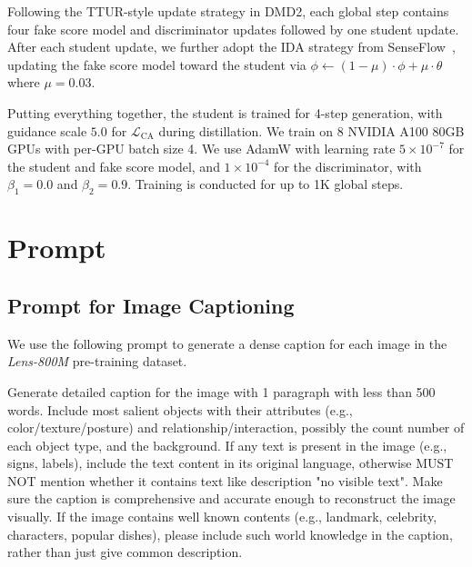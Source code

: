 Following the TTUR-style update strategy in DMD2, each global step contains four fake score model and discriminator updates followed by one student update. After each student update, we further adopt the IDA strategy from SenseFlow~\citep{senseflow}, updating the fake score model toward the student via $\phi \leftarrow (1-\mu) \cdot \phi+\mu \cdot \theta$ where $\mu=0.03$.

Putting everything together, the student is trained for 4-step generation, with guidance scale $5.0$ for $\mathcal{L_{\mathrm{CA}}}$ during distillation. We train on 8 NVIDIA A100 80GB GPUs with per-GPU batch size 4. We use AdamW with learning rate $5\times10^{-7}$ for the student and fake score model, and $1\times10^{-4}$ for the discriminator, with $\beta_1=0.0$ and $\beta_2=0.9$. Training is conducted for up to 1K global steps.



\section{Prompt}
\label{sec:all-prompts}

\subsection{Prompt for Image Captioning}
\label{sec:prompt-caption}

We use the following prompt to generate a dense caption for each image in the \textit{Lens-800M} pre-training dataset.

\begin{tcolorbox}[
  breakable,
  enhanced,
  colback=white,
  colframe=black!70,
  boxrule=0.8pt,
  arc=2pt,
  title={Prompt for Image Captioning},
  colbacktitle=black!75,
  coltitle=white,
  fonttitle=\bfseries,
  left=8pt,right=8pt,top=8pt,bottom=8pt
]
\footnotesize
Generate detailed caption for the image with 1 paragraph with less than 500 words. Include most salient objects with their attributes (e.g., color/texture/posture) and relationship/interaction, possibly the count number of each object type, and the background. If any text is present in the image (e.g., signs, labels), include the text content in its original language, otherwise MUST NOT mention whether it contains text like description "no visible text". Make sure the caption is comprehensive and accurate enough to reconstruct the image visually.  If the image contains well known contents (e.g., landmark, celebrity, characters, popular dishes), please include such world knowledge in the caption, rather than just give common description.
\end{tcolorbox}




